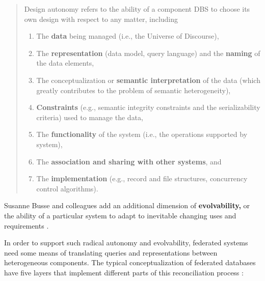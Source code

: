 \documentclass[10pt]{tufte-book}
\begin{document}
\begin{quote}
Design autonomy refers to the ability of a component DBS to choose its
own design with respect to any matter, including

\begin{enumerate}
\def\labelenumi{(\alph{enumi})}
\item
  The \textbf{data} being managed (i.e., the Universe of Discourse),
\item
  The \textbf{representation} (data model, query language) and the
  \textbf{naming} of the data elements,
\item
  The conceptualization or \textbf{semantic interpretation} of the data
  (which greatly contributes to the problem of semantic heterogeneity),
\item
  \textbf{Constraints} (e.g., semantic integrity constraints and the
  serializability criteria) used to manage the data,
\item
  The \textbf{functionality} of the system (i.e., the operations
  supported by system),
\item
  The \textbf{association and sharing with other systems}, and
\item
  The \textbf{implementation} (e.g., record and file structures,
  concurrency control algorithms).
\end{enumerate}
\end{quote}

Susanne Busse and colleagues add an additional dimension of
\textbf{evolvability,} or the ability of a particular system to adapt to
inevitable changing uses and requirements \citep{busseFederatedInformationSystems1999} .

In order to support such radical autonomy and evolvability, federated
systems need some means of translating queries and representations
between heterogeneous components. The typical conceptualization of
federated databases have five layers that implement different parts of
this reconciliation process \citep{shethFederatedDatabaseSystems1990} :
\end{document}
